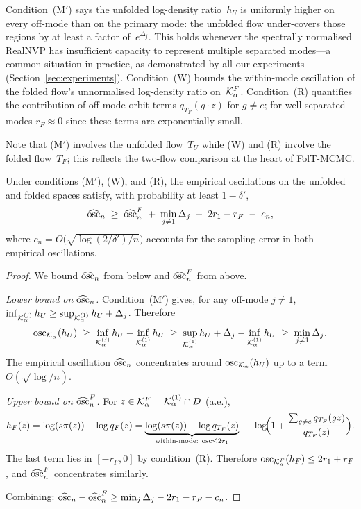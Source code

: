 \noindent
Condition~(M$'$) says the unfolded log-density ratio~$h_U$ is
uniformly higher on every off-mode than on the primary mode: the
unfolded flow under-covers those regions by at least a factor
of~$e^{\Delta_j}$.  This holds whenever the spectrally normalised
RealNVP has insufficient capacity to represent multiple separated
modes---a common situation in practice, as demonstrated by all
our experiments (Section~\ref{sec:experiments}).
Condition~(W) bounds the within-mode oscillation of the folded
flow's unnormalised log-density ratio on~$\mathcal{K}_\alpha^F$.
Condition~(R) quantifies the contribution of off-mode orbit
terms $q_{T_F}(g \cdot z)$ for $g \neq e$; for well-separated
modes $r_F \approx 0$ since these terms are exponentially small.

Note that (M$'$) involves the unfolded flow~$T_U$ while (W) and
(R) involve the folded flow~$T_F$; this reflects the two-flow
comparison at the heart of FolT-MCMC.

\begin{lemma}\label{lem:osc_gap}
  Under conditions \textup{(M$'$)}, \textup{(W)}, and
  \textup{(R)}, the empirical oscillations on the unfolded and
  folded spaces satisfy, with probability at least $1 - \delta'$,
  \begin{equation}\label{eq:osc_gap}
    \widehat{\mathrm{osc}}_n
    \;\geq\;
    \widehat{\mathrm{osc}}_n^F
    \;+\; \min_{j \neq 1} \Delta_j
    \;-\; 2r_1 - r_F
    \;-\; c_n,
  \end{equation}
  where $c_n = O\!\bigl(\sqrt{\log(2/\delta')/n}\bigr)$ accounts for
  the sampling error in both empirical oscillations.
\end{lemma}

\begin{proof}
  We bound $\widehat{\mathrm{osc}}_n$ from below and $\widehat{\mathrm{osc}}_n^F$
  from above.

  \emph{Lower bound on $\widehat{\mathrm{osc}}_n$.}\;
  Condition~(M$'$) gives, for any off-mode $j \neq 1$,
  $\inf_{\mathcal{K}_\alpha^{(j)}} h_U \geq \sup_{\mathcal{K}_\alpha^{(1)}} h_U
  + \Delta_j$.
  Therefore
  \[
    \mathrm{osc}_{\mathcal{K}_\alpha}(h_U)
    \;\geq\;
    \inf_{\mathcal{K}_\alpha^{(j)}} h_U - \inf_{\mathcal{K}_\alpha^{(1)}} h_U
    \;\geq\;
    \sup_{\mathcal{K}_\alpha^{(1)}} h_U + \Delta_j - \inf_{\mathcal{K}_\alpha^{(1)}} h_U
    \;\geq\;
    \min_{j \neq 1}\Delta_j.
  \]
  The empirical oscillation $\widehat{\mathrm{osc}}_n$ concentrates around
  $\mathrm{osc}_{\mathcal{K}_\alpha}(h_U)$ up to a term $O(\sqrt{\log/n})$.

  \emph{Upper bound on $\widehat{\mathrm{osc}}_n^F$.}\;
  For $z \in \mathcal{K}_\alpha^F = \mathcal{K}_\alpha^{(1)} \cap D$ (a.e.),
  \[
    h_F(z) = \log(s\pi(z)) - \log q_F(z)
    = \underbrace{\log(s\pi(z)) - \log q_{T_F}(z)}_{\text{within-mode:
      osc} \leq 2r_1}
    \;-\; \log\!\Bigl(1 + \frac{\sum_{g \neq e} q_{T_F}(gz)}{q_{T_F}(z)}\Bigr).
  \]
  The last term lies in $[-r_F, 0]$ by condition~(R).
  Therefore $\mathrm{osc}_{\mathcal{K}_\alpha^F}(h_F) \leq 2r_1 + r_F$, and
  $\widehat{\mathrm{osc}}_n^F$ concentrates similarly.

  Combining: $\widehat{\mathrm{osc}}_n - \widehat{\mathrm{osc}}_n^F \geq
  \min_j \Delta_j - 2r_1 - r_F - c_n$.
\end{proof}

